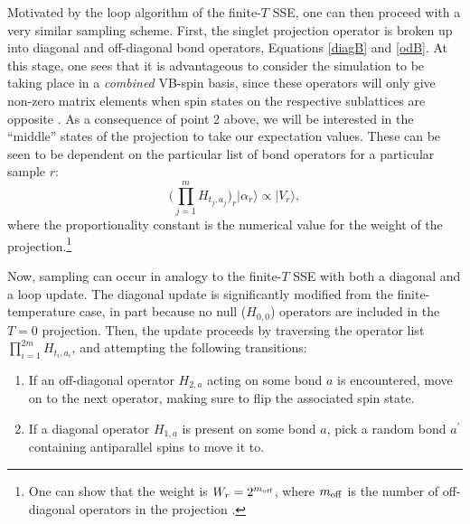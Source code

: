 \documentclass[vecphys]{svmult}
\begin{document}
Motivated by the loop algorithm of the finite-$T$ SSE, one can then proceed with a very similar sampling scheme.  First, the singlet projection operator is broken up into diagonal and off-diagonal bond operators, Equations \ref{diagB} and \ref{odB}.
At this stage, one sees that it is advantageous to consider the simulation to be taking place in a {\em combined} VB-spin basis, since these operators will only give non-zero matrix elements when spin states on the respective sublattices are opposite \cite{Melko:Sandvik10a}.  
As a consequence of point 2 above, we will be interested in the ``middle'' states of the projection to take our expectation values.  
These can be seen to be dependent on the particular list of bond operators for a particular sample $r$: 
\begin{equation}
\big( \prod_{j=1}^{m} {H_{t_j,a_j}} \big)_r | \alpha_r \rangle \propto |V_r \rangle, \label{midV}
\end{equation}
where the proportionality constant is the numerical value for the weight of the projection.\footnote{One can show that the weight is $W_r = 2^{m_{\rm off}}$, where $m_{\rm off}$ is the number of off-diagonal operators in the projection \cite{Melko:Sandvik05,Melko:AWSBeach}.}

Now, sampling can occur in analogy to the finite-$T$ SSE with both a diagonal and a loop update.
The diagonal update is significantly modified from the finite-temperature case, in part because no null ($H_{0,0}$) operators are included in the $T=0$ projection.  Then, the update proceeds by traversing the operator list $\prod_{i=1}^{2m} {H_{t_i,a_i}}$, and attempting the following transitions:
\begin{enumerate}
\item If an off-diagonal operator $H_{2,a}$ acting on some bond $a$ is encountered, move on to the next operator, making sure to flip the associated spin state.
\item If a diagonal operator $H_{1,a}$ is present on some bond $a$, pick a random bond $a^\prime$ containing antiparallel spins to move it to.
\end{enumerate}
\end{document}
